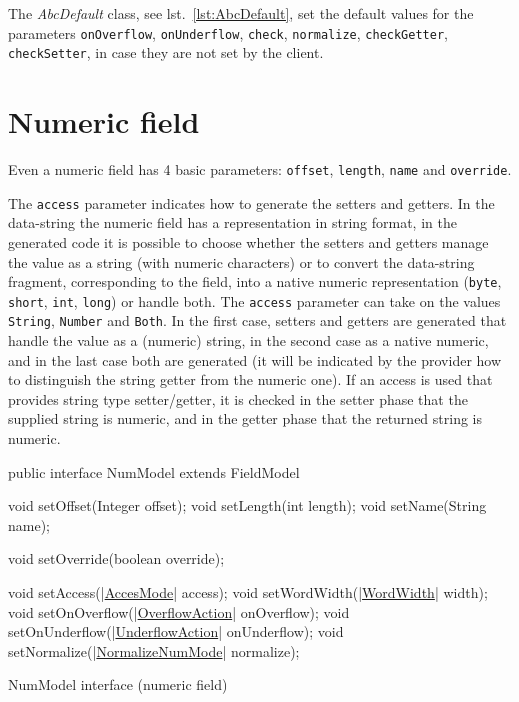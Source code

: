 \documentclass[a4paper,10pt]{report}
\newenvironment{elisting}[1][H]
  {\captionsetup{aboveskip=0pt}\begin{listing}[#1]}
  {\end{listing}%
}
\begin{document}
The \textsl{AbcDefault} class, see lst.~\ref{lst:AbcDefault}, set the default 
values for the parameters \verb!onOverflow!, \verb!onUnderflow!, \verb!check!, 
\verb!normalize!, \verb!checkGetter!, \verb!checkSetter!, in case they are not 
set by the client.

\section{Numeric field}\label{sec:spi.num}
Even a numeric field has 4 basic parameters: \verb!offset!, \verb!length!,
\verb!name! and \verb!override!.

The \verb!access! parameter indicates how to generate the setters and getters. 
In the data-string the numeric field has a representation in string format, in 
the generated code it is possible to choose whether the setters and getters 
manage the value as a string (with numeric characters) or to convert 
the data-string fragment, corresponding to the field, into a native numeric 
representation (\verb!byte!, \verb!short!, \verb!int!, \verb!long!) or 
handle both.
%
The \verb!access! parameter can take on the values \verb!String!, \verb!Number! 
and \verb!Both!. In the first case, setters and getters are generated that 
handle the value as a (numeric) string, in the second case as a native numeric, 
and in the last case both are generated (it will be indicated by the provider 
how to distinguish the string getter from the numeric one). 
If an access is used that provides string type setter/getter, it is checked in 
the setter phase that the supplied string is numeric, and in the getter phase 
that the returned string is numeric.

\begin{elisting}[!htb]
\begin{javacode}
public interface NumModel extends FieldModel {
    void setOffset(Integer offset);
    void setLength(int length);
    void setName(String name);

    void setOverride(boolean override);

    void setAccess(|\hyperref[lst:AccesMode]{AccesMode}| access);
    void setWordWidth(|\hyperref[lst:WordWidth]{WordWidth}| width);
    void setOnOverflow(|\hyperref[lst:OverflowAction]{OverflowAction}| onOverflow);
    void setOnUnderflow(|\hyperref[lst:UnderflowAction]{UnderflowAction}| onUnderflow);
    void setNormalize(|\hyperref[lst:NormalizeNumMode]{NormalizeNumMode}| normalize);
}
\end{javacode}
\caption{NumModel interface (numeric field)}
\label{lst:NumModel}
\end{elisting}
\end{document}
